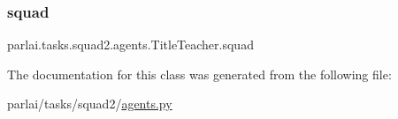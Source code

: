 \subsubsection{\texorpdfstring{squad}{squad}}
{\footnotesize\ttfamily parlai.\+tasks.\+squad2.\+agents.\+Title\+Teacher.\+squad}



The documentation for this class was generated from the following file\+:\begin{DoxyCompactItemize}
\item 
parlai/tasks/squad2/\hyperlink{parlai_2tasks_2squad2_2agents_8py}{agents.\+py}\end{DoxyCompactItemize}
